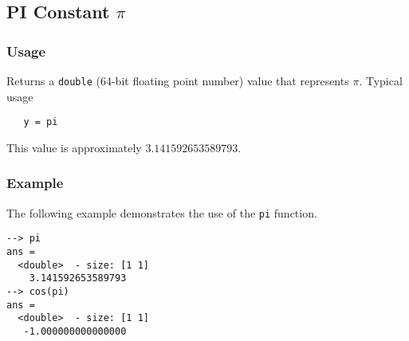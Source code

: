 %
%
%
\subsection{PI Constant $\pi$}
\subsubsection{Usage}
Returns a \verb|double| (64-bit floating point number) value that represents $\pi$.  Typical usage 
\begin{verbatim}
   y = pi
\end{verbatim}
This value is approximately $3.141592653589793$.
\subsubsection{Example}
The following example demonstrates the use of the \verb|pi| function.
\begin{verbatim}
--> pi
ans =
  <double>  - size: [1 1]
    3.141592653589793
--> cos(pi)
ans =
  <double>  - size: [1 1]
   -1.000000000000000
\end{verbatim}
